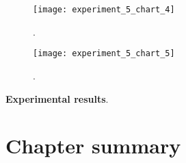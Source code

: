 \begin{figure}[H]
  \centering
  \texttt{[image: experiment\_5\_chart\_4]}
  \caption{.}
  \label{fig:???}
\end{figure}

\begin{figure}[H]
  \centering
  \texttt{[image: experiment\_5\_chart\_5]}
  \caption{.}
  \label{fig:???}
\end{figure}

\textbf{Experimental results}.

\section{Chapter summary}
